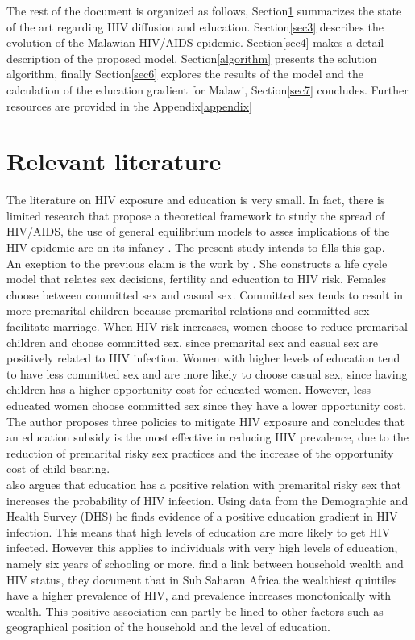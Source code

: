 The rest of the document is organized as follows, Section\ref{sec2} summarizes the state of the art regarding HIV diffusion and education. Section\ref{sec3} describes the evolution of the Malawian HIV/AIDS epidemic. Section\ref{sec4} makes a detail description of the proposed model. Section\ref{algorithm} presents the solution algorithm, finally Section\ref{sec6} explores the results of the model and the calculation of the education gradient for Malawi, Section\ref{sec7} concludes. Further resources are provided in the Appendix\ref{appendix}

\section{Relevant literature}\label{sec2}

The literature on HIV exposure and education is very small. In fact, there is limited research that propose a theoretical framework to study the spread of HIV/AIDS, the use of general equilibrium models to asses implications of the HIV epidemic are on its infancy \cite{michelle}. The present study intends to fills this gap.\\
An exeption to the previous claim is the work by \cite{yaoyao}. She constructs a life cycle model that relates sex decisions, fertility and education to HIV risk. Females choose between committed sex and casual sex. Committed sex tends to result in more premarital children because premarital relations and committed sex facilitate marriage. When HIV risk increases, women choose to reduce premarital children and choose committed sex, since premarital sex and casual sex are positively related to HIV infection. Women with higher levels of education tend to have less committed sex and are more likely to choose casual sex, since having children has a higher opportunity cost for educated women. However, less educated women choose committed sex since they have a lower opportunity cost.  The author proposes three policies to mitigate HIV exposure and concludes that an education subsidy is the most effective in reducing HIV prevalence, due to the reduction of premarital risky sex practices and the increase of the opportunity cost of child bearing.\\


\cite{fort} also argues that education has a positive relation with premarital risky sex that increases the probability of HIV infection. Using data from the Demographic and Health Survey (DHS) he finds evidence of a positive education gradient in HIV infection. This means that high levels of education are more likely to get HIV infected. However this applies to individuals with very high levels of education, namely six years of schooling or more. \cite{mirsha} find a link between household wealth and HIV status, they document that in Sub Saharan Africa the wealthiest quintiles have a higher prevalence of HIV, and prevalence increases monotonically with wealth. This positive association can partly be lined to other factors such as geographical position of the household and the level of education. \\

